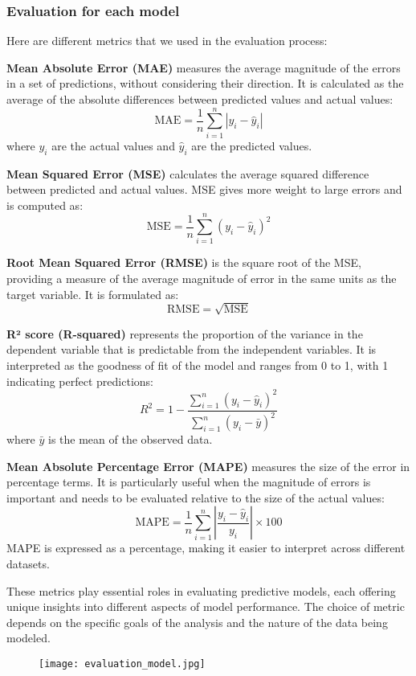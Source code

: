 \documentclass[a4paper, 12pt]{article}
\begin{document}
\subsubsection{Evaluation for each model}

Here are different metrics that we used in the evaluation process:

\textbf{Mean Absolute Error (MAE)} measures the average magnitude of the errors in a set of predictions, without considering their direction. It is calculated as the average of the absolute differences between predicted values and actual values:
\[
\text{MAE} = \frac{1}{n} \sum_{i=1}^{n} |y_i - \hat{y}_i|
\]
where \( y_i \) are the actual values and \( \hat{y}_i \) are the predicted values.

\textbf{Mean Squared Error (MSE)} calculates the average squared difference between predicted and actual values. MSE gives more weight to large errors and is computed as:
\[
\text{MSE} = \frac{1}{n} \sum_{i=1}^{n} (y_i - \hat{y}_i)^2
\]

\textbf{Root Mean Squared Error (RMSE)} is the square root of the MSE, providing a measure of the average magnitude of error in the same units as the target variable. It is formulated as:
\[
\text{RMSE} = \sqrt{\text{MSE}}
\]

\textbf{R² score (R-squared)} represents the proportion of the variance in the dependent variable that is predictable from the independent variables. It is interpreted as the goodness of fit of the model and ranges from 0 to 1, with 1 indicating perfect predictions:
\[
R^2 = 1 - \frac{\sum_{i=1}^{n} (y_i - \hat{y}_i)^2}{\sum_{i=1}^{n} (y_i - \bar{y})^2}
\]
where \( \bar{y} \) is the mean of the observed data.

\textbf{Mean Absolute Percentage Error (MAPE)} measures the size of the error in percentage terms. It is particularly useful when the magnitude of errors is important and needs to be evaluated relative to the size of the actual values:
\[
\text{MAPE} = \frac{1}{n} \sum_{i=1}^{n} \left| \frac{y_i - \hat{y}_i}{y_i} \right| \times 100
\]
MAPE is expressed as a percentage, making it easier to interpret across different datasets.

These metrics play essential roles in evaluating predictive models, each offering unique insights into different aspects of model performance. The choice of metric depends on the specific goals of the analysis and the nature of the data being modeled.

\begin{figure}[tbh]
    \centering
    \texttt{[image: evaluation\_model.jpg]}
\end{figure}
\end{document}
